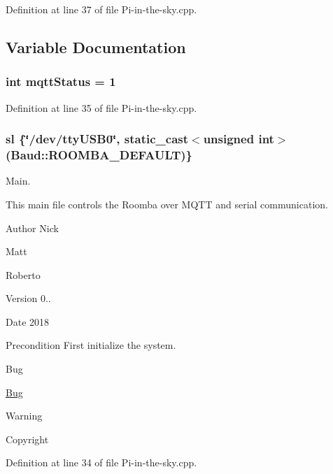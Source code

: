 Definition at line 37 of file Pi-\/in-\/the-\/sky.\+cpp.



\subsection{Variable Documentation}
\subsubsection[{\texorpdfstring{mqtt\+Status}{mqttStatus}}]{\setlength{\rightskip}{0pt plus 5cm}int mqtt\+Status = 1}\hypertarget{_pi-in-the-sky_8cpp_af28aa3fad3574f60f4f6a9b2f01ccff0}{}\label{_pi-in-the-sky_8cpp_af28aa3fad3574f60f4f6a9b2f01ccff0}


Definition at line 35 of file Pi-\/in-\/the-\/sky.\+cpp.

\subsubsection[{\texorpdfstring{sl}{sl}}]{ sl \{\char`\"{}/dev/tty\+U\+S\+B0\char`\"{}, static\+\_\+cast$<$unsigned int$>$({\bf Baud\+::\+R\+O\+O\+M\+B\+A\+\_\+\+D\+E\+F\+A\+U\+LT})\}}\hypertarget{_pi-in-the-sky_8cpp_a4b5d2a4822c9b9ecddf5750239626d47}{}\label{_pi-in-the-sky_8cpp_a4b5d2a4822c9b9ecddf5750239626d47}


Main. 

This main file controls the Roomba over M\+Q\+TT and serial communication. \begin{DoxyAuthor}{Author}
Nick 

Matt 

Roberto 
\end{DoxyAuthor}
\begin{DoxyVersion}{Version}
0.. 
\end{DoxyVersion}
\begin{DoxyDate}{Date}
2018 
\end{DoxyDate}
\begin{DoxyPrecond}{Precondition}
First initialize the system. 
\end{DoxyPrecond}
\begin{DoxyRefDesc}{Bug}
\item[\hyperlink{bug__bug000001}{Bug}]\end{DoxyRefDesc}
\begin{DoxyWarning}{Warning}

\end{DoxyWarning}
\begin{DoxyCopyright}{Copyright}

\end{DoxyCopyright}


Definition at line 34 of file Pi-\/in-\/the-\/sky.\+cpp.

